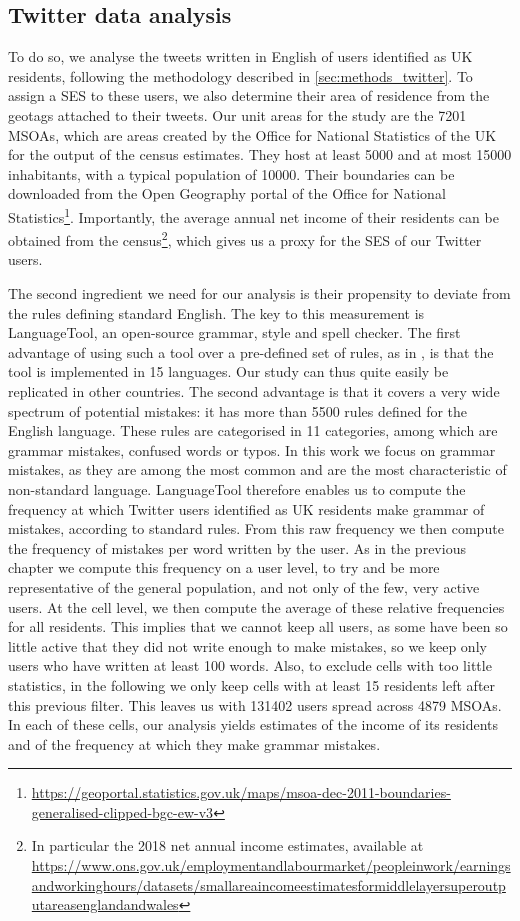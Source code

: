 \documentclass[../thesis.tex]{subfiles}
\begin{document}
\subsection{Twitter data analysis}
To do so, we analyse the tweets written in English of users identified as UK residents,
following the methodology described in \cref{sec:methods_twitter}. To assign a \ac{SES}
to these users, we also determine their area of residence from the geotags attached to
their tweets. Our unit areas for the study are the \SI{7201}{} \acp{MSOA}, which are
areas created by the Office for National Statistics of the UK for the output of the
census estimates. They host at least \SI{5000}{} and at most \SI{15000}{} inhabitants,
with a typical population of \SI{10000}{}. Their boundaries can be downloaded from the
Open Geography portal of the Office for National
Statistics\footnote{\url{https://geoportal.statistics.gov.uk/maps/msoa-dec-2011-boundaries-generalised-clipped-bgc-ew-v3}}.
Importantly, the average annual net income of their residents can be obtained from the
census\footnote{In particular the 2018 net annual income estimates, available at
\url{https://www.ons.gov.uk/employmentandlabourmarket/peopleinwork/earningsandworkinghours/datasets/smallareaincomeestimatesformiddlelayersuperoutputareasenglandandwales}},
which gives us a proxy for the \ac{SES} of our Twitter users.

The second ingredient we need for our analysis is their propensity to deviate from the
rules defining standard English. The key to this measurement is LanguageTool, an
open-source grammar, style and spell checker. The first advantage of using such a tool
over a pre-defined set of rules, as in \cite{AbitbolSocioeconomicDependencies2018}, is
that the tool is implemented in 15 languages. Our study can thus quite easily be
replicated in other countries. The second advantage is that it covers a very wide
spectrum of potential mistakes: it has more than \SI{5500}{} rules defined for the
English language. These rules are categorised in 11 categories, among which are grammar
mistakes, confused words or typos. In this work we focus on grammar mistakes, as they
are among the most common and are the most characteristic of non-standard language.
LanguageTool therefore enables us to compute the frequency at which Twitter users
identified as UK residents make grammar of mistakes, according to standard rules. From
this raw frequency we then compute the frequency of mistakes per word written by the
user. As in the previous chapter we compute this frequency on a user level, to try and
be more representative of the general population, and not only of the few, very active
users. At the cell level, we then compute the average of these relative frequencies for
all residents. This implies that we cannot keep all users, as some have been so little
active that they did not write enough to make mistakes, so we keep only users who have
written at least 100 words. Also, to exclude cells with too little statistics, in the
following we only keep cells with at least 15 residents left after this previous filter.
This leaves us with \SI{131402}{} users spread across \SI{4879}{} \acp{MSOA}. In each of
these cells, our analysis yields estimates of the income of its residents and of the
frequency at which they make grammar mistakes.
\end{document}
